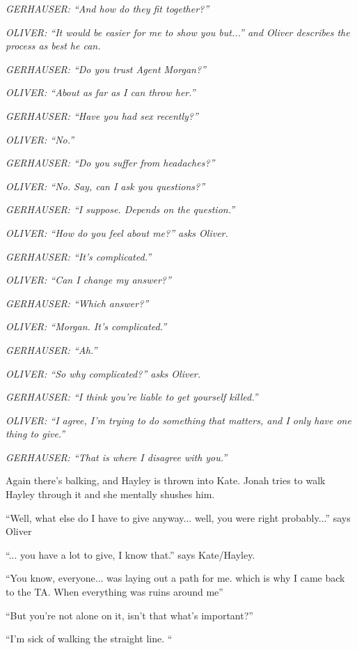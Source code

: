 \textit{GERHAUSER: ``And how do they fit together?''}

\textit{OLIVER: ``It would be easier for me to show you but...'' and Oliver describes the process as best he can.}

\textit{GERHAUSER: ``Do you trust Agent Morgan?''}

\textit{OLIVER: ``About as far as I can throw her.''}

\textit{GERHAUSER: ``Have you had sex recently?''}

\textit{OLIVER: ``No.''}

\textit{GERHAUSER: ``Do you suffer from headaches?''}

\textit{OLIVER: ``No.  Say, can I ask you questions?''}

\textit{GERHAUSER: ``I suppose.  Depends on the question.''}

\textit{OLIVER: ``How do you feel about me?'' asks Oliver.}

\textit{GERHAUSER: ``It's complicated.''}



\textit{OLIVER: ``Can I change my answer?''}

\textit{GERHAUSER: ``Which answer?''}

\textit{OLIVER: ``Morgan.  It's complicated.''}

\textit{GERHAUSER: ``Ah.''}

\textit{OLIVER: ``So why complicated?'' asks Oliver.}

\textit{GERHAUSER: ``I think you're liable to get yourself killed.''}

\textit{OLIVER: ``I agree, I'm trying to do something that matters, and I only have one thing to give.''}

\textit{GERHAUSER: ``That is where I disagree with you.''}

Again there's balking, and Hayley is thrown into Kate.  Jonah tries to walk Hayley through it and she mentally shushes him.  

``Well, what else do I have to give anyway... well, you were right probably...'' says Oliver

``... you have a lot to give, I know that.'' says Kate/Hayley.

``You know, everyone... was laying out a path for me. which is why I came back to the TA.  When everything was ruins around me''

``But you're not alone on it, isn't that what's important?''

``I'm sick of walking the straight line. ``




